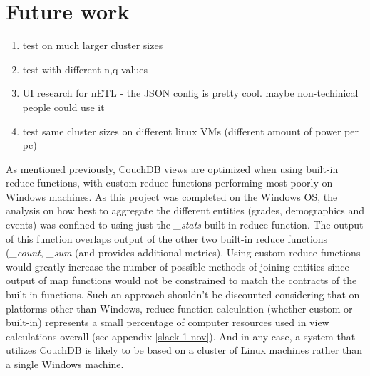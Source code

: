 \section{Future work}

\begin{enumerate}
    \item test on much larger cluster sizes
    \item test with different n,q values
    \item UI research for nETL - the JSON config is pretty cool. maybe non-techinical people could use it
    \item test same cluster sizes on different linux VMs (different amount of power per pc)
\end{enumerate}


As mentioned previously, CouchDB views are optimized when using built-in reduce functions, with custom reduce functions performing most poorly on Windows machines. As this project was completed on the Windows OS, the analysis on how best to aggregate the different entities (grades, demographics and events) was confined to using just the \textit{\_stats} built in reduce function. The output of this function overlaps output of the other two built-in reduce functions (\textit{\_count}, \textit{\_sum} (and provides additional metrics). Using custom reduce functions would greatly increase the number of possible methods of joining entities since output of map functions would not be constrained to match the contracts of the built-in functions. Such an approach shouldn't be discounted considering that on platforms other than Windows, reduce function calculation (whether custom or built-in) represents a small percentage of computer resources used in view calculations overall (see appendix \ref{slack-1-nov}). And in any case, a system that utilizes CouchDB is likely to be based on a cluster of Linux machines rather than a single Windows machine.